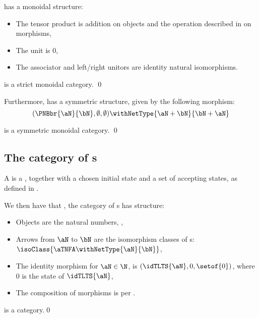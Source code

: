 \mPNBCat{} has a monoidal structure:

\begin{itemize}
    \item The tensor product is addition on objects and the operation described
        in  on morphisms,
    \item The unit is $0$,
    \item The associator and left/right unitors are identity natural
        isomorphisms.
\end{itemize}

\begin{proposition}
    \mPNBCat{} is a strict monoidal category. \qed
\end{proposition}

Furthermore, \mPNBCat{} has a symmetric structure, given by the following
morphism:
\[
    (\PNBbr{\aN}{\bN}, \emptyset, \emptyset) \withNetType{\aN + \bN}{\bN + \aN}
\]

\begin{proposition}
    \mPNBCat{} is a symmetric monoidal category. \qed
\end{proposition}

\subsection{The category of \TNFA{}s}

A \TNFA{} is a \TLTS{}, together with a chosen initial state and a set of accepting states, as
defined in .

We then have that \TNFACat{}, the category of \TNFA{}s has structure:

\begin{itemize}
\item Objects are the natural numbers, \N,
\item Arrows from $\aN$ to $\bN$ are the isomorphism classes of \TNFA{}s:
    $\isoClass{\aTNFA \withNetType{\aN}{\bN}}$,
\item The identity morphism for $\aN \in \N$, is
    $(\idTLTS{\aN}, 0, \setof{0})$, where $0$ is the state of $\idTLTS{\aN}$,
\item The composition of morphisms is per .
\end{itemize}

\begin{proposition}
    \TNFACat{} is a category.\qed
\end{proposition}

